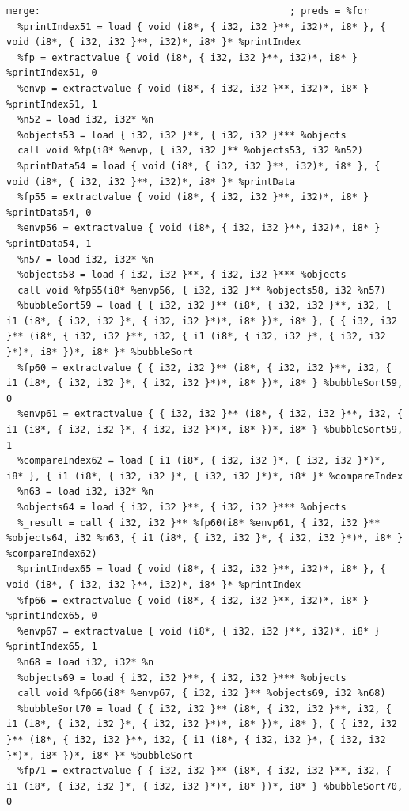 \documentclass[12pt]{article}
\begin{document}
\begin{mdframed}[hidealllines=true,backgroundcolor=green!10]
\begin{lstlisting}
merge:                                            ; preds = %for
  %printIndex51 = load { void (i8*, { i32, i32 }**, i32)*, i8* }, { void (i8*, { i32, i32 }**, i32)*, i8* }* %printIndex
  %fp = extractvalue { void (i8*, { i32, i32 }**, i32)*, i8* } %printIndex51, 0
  %envp = extractvalue { void (i8*, { i32, i32 }**, i32)*, i8* } %printIndex51, 1
  %n52 = load i32, i32* %n
  %objects53 = load { i32, i32 }**, { i32, i32 }*** %objects
  call void %fp(i8* %envp, { i32, i32 }** %objects53, i32 %n52)
  %printData54 = load { void (i8*, { i32, i32 }**, i32)*, i8* }, { void (i8*, { i32, i32 }**, i32)*, i8* }* %printData
  %fp55 = extractvalue { void (i8*, { i32, i32 }**, i32)*, i8* } %printData54, 0
  %envp56 = extractvalue { void (i8*, { i32, i32 }**, i32)*, i8* } %printData54, 1
  %n57 = load i32, i32* %n
  %objects58 = load { i32, i32 }**, { i32, i32 }*** %objects
  call void %fp55(i8* %envp56, { i32, i32 }** %objects58, i32 %n57)
  %bubbleSort59 = load { { i32, i32 }** (i8*, { i32, i32 }**, i32, { i1 (i8*, { i32, i32 }*, { i32, i32 }*)*, i8* })*, i8* }, { { i32, i32 }** (i8*, { i32, i32 }**, i32, { i1 (i8*, { i32, i32 }*, { i32, i32 }*)*, i8* })*, i8* }* %bubbleSort
  %fp60 = extractvalue { { i32, i32 }** (i8*, { i32, i32 }**, i32, { i1 (i8*, { i32, i32 }*, { i32, i32 }*)*, i8* })*, i8* } %bubbleSort59, 0
  %envp61 = extractvalue { { i32, i32 }** (i8*, { i32, i32 }**, i32, { i1 (i8*, { i32, i32 }*, { i32, i32 }*)*, i8* })*, i8* } %bubbleSort59, 1
  %compareIndex62 = load { i1 (i8*, { i32, i32 }*, { i32, i32 }*)*, i8* }, { i1 (i8*, { i32, i32 }*, { i32, i32 }*)*, i8* }* %compareIndex
  %n63 = load i32, i32* %n
  %objects64 = load { i32, i32 }**, { i32, i32 }*** %objects
  %_result = call { i32, i32 }** %fp60(i8* %envp61, { i32, i32 }** %objects64, i32 %n63, { i1 (i8*, { i32, i32 }*, { i32, i32 }*)*, i8* } %compareIndex62)
  %printIndex65 = load { void (i8*, { i32, i32 }**, i32)*, i8* }, { void (i8*, { i32, i32 }**, i32)*, i8* }* %printIndex
  %fp66 = extractvalue { void (i8*, { i32, i32 }**, i32)*, i8* } %printIndex65, 0
  %envp67 = extractvalue { void (i8*, { i32, i32 }**, i32)*, i8* } %printIndex65, 1
  %n68 = load i32, i32* %n
  %objects69 = load { i32, i32 }**, { i32, i32 }*** %objects
  call void %fp66(i8* %envp67, { i32, i32 }** %objects69, i32 %n68)
  %bubbleSort70 = load { { i32, i32 }** (i8*, { i32, i32 }**, i32, { i1 (i8*, { i32, i32 }*, { i32, i32 }*)*, i8* })*, i8* }, { { i32, i32 }** (i8*, { i32, i32 }**, i32, { i1 (i8*, { i32, i32 }*, { i32, i32 }*)*, i8* })*, i8* }* %bubbleSort
  %fp71 = extractvalue { { i32, i32 }** (i8*, { i32, i32 }**, i32, { i1 (i8*, { i32, i32 }*, { i32, i32 }*)*, i8* })*, i8* } %bubbleSort70, 0

\end{lstlisting}
\end{mdframed}
\end{document}
